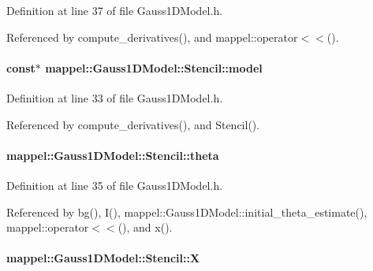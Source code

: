 Definition at line 37 of file Gauss1\+D\+Model.\+h.



Referenced by compute\+\_\+derivatives(), and mappel\+::operator$<$$<$().

\paragraph[{\texorpdfstring{model}{model}}]{ const$\ast$ mappel\+::\+Gauss1\+D\+Model\+::\+Stencil\+::model}\hypertarget{classmappel_1_1Gauss1DModel_1_1Stencil_a22c7f0f7fd29ee1cc587f331ef186c76}{}\label{classmappel_1_1Gauss1DModel_1_1Stencil_a22c7f0f7fd29ee1cc587f331ef186c76}


Definition at line 33 of file Gauss1\+D\+Model.\+h.



Referenced by compute\+\_\+derivatives(), and Stencil().

\paragraph[{\texorpdfstring{theta}{theta}}]{ mappel\+::\+Gauss1\+D\+Model\+::\+Stencil\+::theta}\hypertarget{classmappel_1_1Gauss1DModel_1_1Stencil_a2428fa45a83396cad7861fbeea44a86a}{}\label{classmappel_1_1Gauss1DModel_1_1Stencil_a2428fa45a83396cad7861fbeea44a86a}


Definition at line 35 of file Gauss1\+D\+Model.\+h.



Referenced by bg(), I(), mappel\+::\+Gauss1\+D\+Model\+::initial\+\_\+theta\+\_\+estimate(), mappel\+::operator$<$$<$(), and x().

\paragraph[{\texorpdfstring{X}{X}}]{ mappel\+::\+Gauss1\+D\+Model\+::\+Stencil\+::X}\hypertarget{classmappel_1_1Gauss1DModel_1_1Stencil_a1cb021aeb56c7fadd2a6b401d95239ae}{}\label{classmappel_1_1Gauss1DModel_1_1Stencil_a1cb021aeb56c7fadd2a6b401d95239ae}


